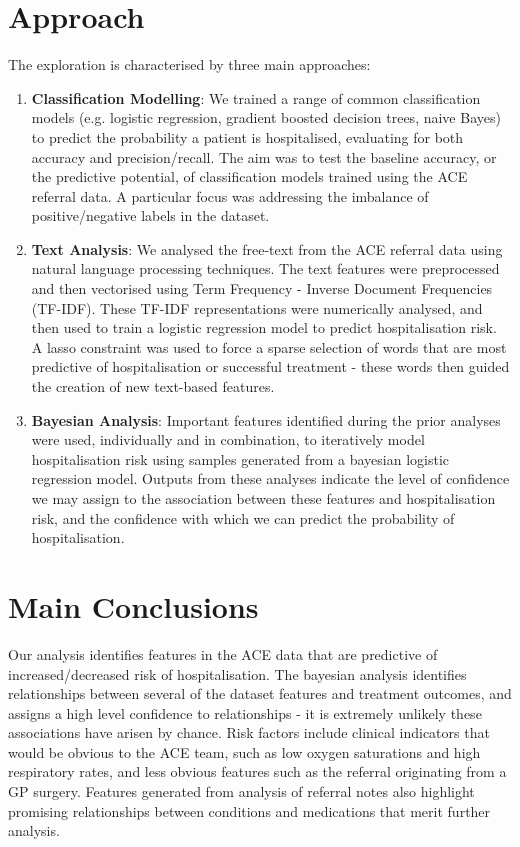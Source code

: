 \section*{Approach}\label{sec:approach}

The exploration is characterised by three main approaches:
\begin{enumerate}
    \item \textbf{Classification Modelling}: We trained a range of common classification models (e.g. logistic regression, gradient boosted decision trees, naive Bayes) to predict the probability a patient is hospitalised, evaluating for both accuracy and precision/recall. The aim was to test the baseline accuracy, or the predictive potential, of classification models trained using the ACE referral data. A particular focus was addressing the imbalance of positive/negative labels in the dataset.
    \item \textbf{Text Analysis}: We analysed the free-text from the ACE referral data using natural language processing techniques.
    The text features were preprocessed and then vectorised using Term Frequency - Inverse Document Frequencies (TF-IDF). These TF-IDF representations were numerically analysed, and then used to train a logistic regression model to predict hospitalisation risk. A lasso constraint was used to force a sparse selection of words that are most predictive of hospitalisation or successful treatment - these words then guided the creation of new text-based features.
    \item \textbf{Bayesian Analysis}: Important features identified during the prior analyses were used, individually and in combination, to iteratively model hospitalisation risk using samples generated from a bayesian logistic regression model.
    Outputs from these analyses indicate the level of confidence we may assign to the association between these features and hospitalisation risk, and the confidence with which we can predict the probability of hospitalisation.
\end{enumerate}

\section*{Main Conclusions}\label{sec:main-conclusions}

Our analysis identifies features in the ACE data that are predictive of increased/decreased risk of hospitalisation. The bayesian analysis identifies relationships between several of the dataset features and treatment outcomes, and assigns a high level confidence to relationships - it is extremely unlikely these associations have arisen by chance. Risk factors include clinical indicators that would be obvious to the ACE team, such as low oxygen saturations and high respiratory rates, and less obvious features such as the referral originating from a GP surgery. Features generated from analysis of referral notes also highlight promising relationships between conditions and medications that merit further analysis.

